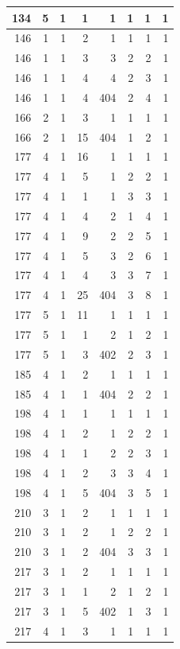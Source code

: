 \documentclass[11pt,]{book}
\begin{document}
\begin{table}
\begin{tabular}[t]{r|r|r|r|r|r|r|r}
\hline
134 & 5 & 1 & 1 & 1 & 1 & 1 & 1\\
\hline
146 & 1 & 1 & 2 & 1 & 1 & 1 & 1\\
\hline
146 & 1 & 1 & 3 & 3 & 2 & 2 & 1\\
\hline
146 & 1 & 1 & 4 & 4 & 2 & 3 & 1\\
\hline
146 & 1 & 1 & 4 & 404 & 2 & 4 & 1\\
\hline
166 & 2 & 1 & 3 & 1 & 1 & 1 & 1\\
\hline
166 & 2 & 1 & 15 & 404 & 1 & 2 & 1\\
\hline
177 & 4 & 1 & 16 & 1 & 1 & 1 & 1\\
\hline
177 & 4 & 1 & 5 & 1 & 2 & 2 & 1\\
\hline
177 & 4 & 1 & 1 & 1 & 3 & 3 & 1\\
\hline
177 & 4 & 1 & 4 & 2 & 1 & 4 & 1\\
\hline
177 & 4 & 1 & 9 & 2 & 2 & 5 & 1\\
\hline
177 & 4 & 1 & 5 & 3 & 2 & 6 & 1\\
\hline
177 & 4 & 1 & 4 & 3 & 3 & 7 & 1\\
\hline
177 & 4 & 1 & 25 & 404 & 3 & 8 & 1\\
\hline
177 & 5 & 1 & 11 & 1 & 1 & 1 & 1\\
\hline
177 & 5 & 1 & 1 & 2 & 1 & 2 & 1\\
\hline
177 & 5 & 1 & 3 & 402 & 2 & 3 & 1\\
\hline
185 & 4 & 1 & 2 & 1 & 1 & 1 & 1\\
\hline
185 & 4 & 1 & 1 & 404 & 2 & 2 & 1\\
\hline
198 & 4 & 1 & 1 & 1 & 1 & 1 & 1\\
\hline
198 & 4 & 1 & 2 & 1 & 2 & 2 & 1\\
\hline
198 & 4 & 1 & 1 & 2 & 2 & 3 & 1\\
\hline
198 & 4 & 1 & 2 & 3 & 3 & 4 & 1\\
\hline
198 & 4 & 1 & 5 & 404 & 3 & 5 & 1\\
\hline
210 & 3 & 1 & 2 & 1 & 1 & 1 & 1\\
\hline
210 & 3 & 1 & 2 & 1 & 2 & 2 & 1\\
\hline
210 & 3 & 1 & 2 & 404 & 3 & 3 & 1\\
\hline
217 & 3 & 1 & 2 & 1 & 1 & 1 & 1\\
\hline
217 & 3 & 1 & 1 & 2 & 1 & 2 & 1\\
\hline
217 & 3 & 1 & 5 & 402 & 1 & 3 & 1\\
\hline
217 & 4 & 1 & 3 & 1 & 1 & 1 & 1\\

\end{tabular}
\end{table}
\end{document}
